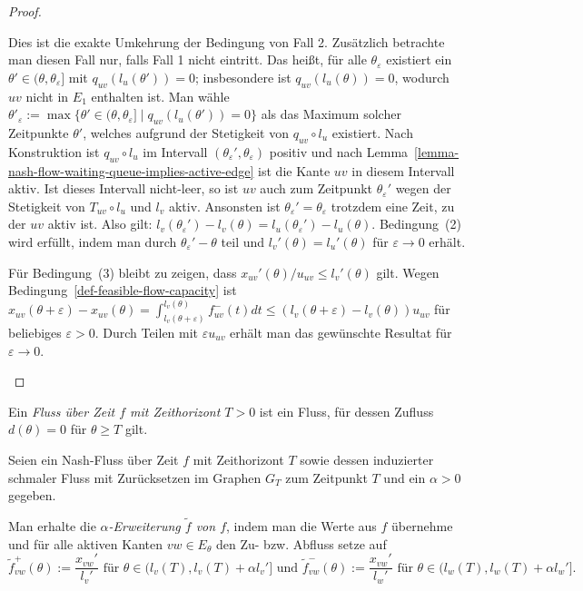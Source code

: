 \begin{proof}
\begin{description}[leftmargin=0cm, topsep=0cm, itemindent=\parindent]
		Dies ist die exakte Umkehrung der Bedingung von Fall 2.
		Zusätzlich betrachte man diesen Fall nur, falls Fall 1 nicht eintritt.
		Das heißt, für alle $\theta_\varepsilon$ existiert ein $\theta'\in(\theta, \theta_\varepsilon]$ mit $q_{uv}(l_u(\theta')) = 0$; insbesondere ist $q_{uv}(l_u(\theta))= 0$, wodurch $uv$ nicht in $E_1$ enthalten ist.
		Man wähle $\theta'_\varepsilon:=\max\{ \theta'\in (\theta, \theta_\varepsilon] \mid q_{uv}(l_u(\theta')) = 0 \}$ als das Maximum solcher Zeitpunkte $\theta'$, welches aufgrund der Stetigkeit von $q_{uv}\circ l_u$ existiert.
		Nach Konstruktion ist $q_{uv}\circ l_u$ im Intervall $(\theta_\varepsilon', \theta_\varepsilon)$ positiv und nach Lemma~\ref{lemma-nash-flow-waiting-queue-implies-active-edge} ist die Kante $uv$ in diesem Intervall aktiv.
		Ist dieses Intervall nicht-leer, so ist $uv$ auch zum Zeitpunkt $\theta_\varepsilon'$ wegen der Stetigkeit von $T_{uv}\circ l_u$ und $l_v$ aktiv.
		Ansonsten ist $\theta_\varepsilon'=\theta_\varepsilon$ trotzdem eine Zeit, zu der $uv$ aktiv ist.
		Also gilt: $l_v(\theta_\varepsilon') - l_v(\theta) = l_u(\theta_\varepsilon') - l_u(\theta)$.
		Bedingung~(2) wird erfüllt, indem man durch $\theta_\varepsilon'-\theta$ teil und $l_v'(\theta) = l_u'(\theta)$ für $\varepsilon\rightarrow0$ erhält.
		
		Für Bedingung~(3) bleibt zu zeigen, dass $x_{uv}'(\theta) /u_{uv}\leq l_v'(\theta)$ gilt.
		Wegen Bedingung~\ref{def-feasible-flow-capacity} ist $x_{uv}(\theta + \varepsilon)-x_{uv}(\theta) = \int_{l_v(\theta+\varepsilon)}^{l_v(\theta)} f_{uv}^-(t) dt\leq (l_v(\theta + \varepsilon) - l_v(\theta)) u_{uv}$ für beliebiges $\varepsilon>0$.
		Durch Teilen mit $\varepsilon u_{uv}$ erhält man das gewünschte Resultat für $\varepsilon\rightarrow 0$.
	\end{description}
\vspace{-1.2 \baselineskip}\end{proof}

\begin{definition}
	Ein \emph{Fluss über Zeit $f$ mit Zeithorizont $T>0$} ist ein Fluss, für dessen Zufluss $d(\theta)= 0$ für $\theta\geq T$ gilt.
\end{definition}

\begin{definition}
	Seien ein Nash-Fluss über Zeit $f$ mit Zeithorizont $T$ sowie dessen induzierter schmaler Fluss mit Zurücksetzen im Graphen $G_T$ zum Zeitpunkt $T$ und ein $\alpha > 0$ gegeben.
	
	
	Man erhalte die \emph{$\alpha$-Erweiterung $\tilde{f}$ von $f$}, indem man die Werte aus $f$ übernehme und für alle aktiven Kanten $vw\in E_\theta$ den Zu- bzw. Abfluss setze auf
	$$\tilde{f}_{vw}^+(\theta):= \frac{x_{vw}'}{l_v'} \text{ für $\theta\in (l_v(T), l_v(T)+\alpha l_v']$ und } \tilde{f}_{vw}^-(\theta):=\frac{x_{vw}'}{l_w'} \text{ für $\theta\in (l_w(T), l_w(T)+\alpha l_w']$.}$$
\end{definition}

